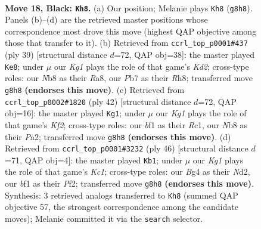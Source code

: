 \documentclass[11pt]{article}
\begin{document}
\clearpage

\begin{figure}[p]\centering
\begin{subfigure}{0.46\textwidth}\centering
\resizebox{\linewidth}{!}{%
\newchessgame
\chessboard[
  setfen={rn3rk1/1pp1bp1P/p7/4P1p1/P1p3b1/2N1P3/1P1N4/R3KB1R b KQ - 0 18},
  showmover=false,
  pgfstyle=straightmove, color=movearrow, markmove={g8-h8}
]}
\caption{}
\end{subfigure}\hfill
\begin{subfigure}{0.46\textwidth}\centering
\resizebox{\linewidth}{!}{%
\newchessgame
\chessboard[
  setfen={r6r/3knppp/p7/N1Npbb2/1P6/8/P4PPP/1RB2RK1 b - - 5 20},
  showmover=false,
  pgfstyle=straightmove, color=movearrow, markmove={d7-e8}
]}
\caption{}
\end{subfigure}
\\[4pt]
\begin{subfigure}{0.46\textwidth}\centering
\resizebox{\linewidth}{!}{%
\newchessgame
\chessboard[
  setfen={3k1r2/1bp1n1r1/pp2p2p/8/3P2p1/2NBP1P1/PPR2K1P/2R5 w - - 0 22},
  showmover=false,
  pgfstyle=straightmove, color=movearrow, markmove={f2-g1}
]}
\caption{}
\end{subfigure}\hfill
\begin{subfigure}{0.46\textwidth}\centering
\resizebox{\linewidth}{!}{%
\newchessgame
\chessboard[
  setfen={r2bk2r/1p5p/5np1/4p3/p1P5/P3B3/1P1N1PRP/2KR4 w kq - 0 24},
  showmover=false,
  pgfstyle=straightmove, color=movearrow, markmove={c1-b1}
]}
\caption{}
\end{subfigure}
\caption{\textbf{Move 18, Black: \texttt{Kh8}.} (a) Our position; Melanie plays \texttt{Kh8} (\texttt{g8h8}). Panels (b)--(d) are the retrieved master positions whose correspondence most drove this move (highest QAP objective among those that transfer to it). (b) Retrieved from \texttt{ccrl\_top\_p0001\#437} (ply 39) [structural distance $d$=72, QAP obj=38]: the master played \texttt{Ke8}; under $\mu$ our \emph{Kg1} plays the role of that game's \emph{Kd2}; cross-type roles: our \emph{N}b8 as their \emph{R}a8, our \emph{P}b7 as their \emph{R}h8; transferred move \texttt{g8h8} \textbf{(endorses this move)}. (c) Retrieved from \texttt{ccrl\_top\_p0002\#1820} (ply 42) [structural distance $d$=72, QAP obj=16]: the master played \texttt{Kg1}; under $\mu$ our \emph{Kg1} plays the role of that game's \emph{Kf2}; cross-type roles: our \emph{b}f1 as their \emph{R}c1, our \emph{N}b8 as their \emph{P}a2; transferred move \texttt{g8h8} \textbf{(endorses this move)}. (d) Retrieved from \texttt{ccrl\_top\_p0001\#3232} (ply 46) [structural distance $d$=71, QAP obj=4]: the master played \texttt{Kb1}; under $\mu$ our \emph{Kg1} plays the role of that game's \emph{Kc1}; cross-type roles: our \emph{B}g4 as their \emph{N}d2, our \emph{b}f1 as their \emph{P}f2; transferred move \texttt{g8h8} \textbf{(endorses this move)}. Synthesis: 3 retrieved analogs transferred to \texttt{Kh8} (summed QAP objective 57, the strongest correspondence among the candidate moves); Melanie committed it via the \texttt{search} selector.}
\label{fig:thought-m35}
\end{figure}
\end{document}
